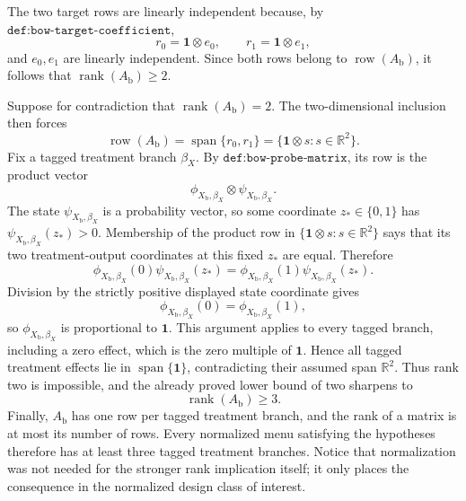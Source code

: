 The two target rows are linearly independent because, by \(\texttt{def:bow-target-coefficient}\),
\[
 r_0=\mathbf 1\otimes e_0,
 \qquad
 r_1=\mathbf 1\otimes e_1,
\]
and \(e_0,e_1\) are linearly independent.  Since both rows belong to \(\operatorname{row}(A_{\mathrm b})\), it follows that \(\operatorname{rank}(A_{\mathrm b})\ge2\).

Suppose for contradiction that \(\operatorname{rank}(A_{\mathrm b})=2\).  The two-dimensional inclusion then forces
\[
 \operatorname{row}(A_{\mathrm b})
 =\operatorname{span}\{r_0,r_1\}
 =\{\mathbf 1\otimes s:s\in\mathbb R^2\}.
\]
Fix a tagged treatment branch \(\beta_X\).  By \(\texttt{def:bow-probe-matrix}\), its row is the product vector
\[
 \phi_{X_{\mathrm b},\beta_X}\otimes\psi_{X_{\mathrm b},\beta_X}.
\]
The state \(\psi_{X_{\mathrm b},\beta_X}\) is a probability vector, so some coordinate \(z_*\in\{0,1\}\) has \(\psi_{X_{\mathrm b},\beta_X}(z_*)>0\).  Membership of the product row in \(\{\mathbf 1\otimes s:s\in\mathbb R^2\}\) says that its two treatment-output coordinates at this fixed \(z_*\) are equal.  Therefore
\[
 \phi_{X_{\mathrm b},\beta_X}(0)\psi_{X_{\mathrm b},\beta_X}(z_*)
 =\phi_{X_{\mathrm b},\beta_X}(1)\psi_{X_{\mathrm b},\beta_X}(z_*).
\]
Division by the strictly positive displayed state coordinate gives
\[
 \phi_{X_{\mathrm b},\beta_X}(0)=\phi_{X_{\mathrm b},\beta_X}(1),
\]
so \(\phi_{X_{\mathrm b},\beta_X}\) is proportional to \(\mathbf 1\).  This argument applies to every tagged branch, including a zero effect, which is the zero multiple of \(\mathbf 1\).  Hence all tagged treatment effects lie in \(\operatorname{span}\{\mathbf 1\}\), contradicting their assumed span \(\mathbb R^2\).  Thus rank two is impossible, and the already proved lower bound of two sharpens to
\[
 \operatorname{rank}(A_{\mathrm b})\ge3.
\]
Finally, \(A_{\mathrm b}\) has one row per tagged treatment branch, and the rank of a matrix is at most its number of rows.  Every normalized menu satisfying the hypotheses therefore has at least three tagged treatment branches.  Notice that normalization was not needed for the stronger rank implication itself; it only places the consequence in the normalized design class of interest.